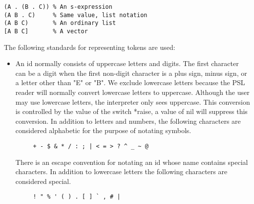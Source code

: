 \begin{verbatim}
(A . (B . C)) % An s-expression
(A B . C)     % Same value, list notation
(A B C)       % An ordinary list
[A B C]       % A vector
\end{verbatim}
  The following standards for representing tokens are used:
\begin{itemize}
\item An id normally consists of uppercase  letters  and  digits.
     The first character can be a digit when the first non-digit
     character  is  a  plus  sign, minus sign, or a letter other
     than "E" or "B".  We exclude lowercase letters because  the
     PSL  reader  will  normally  convert  lowercase  letters to
     uppercase.  Although the user may  use  lowercase  letters,
     the  interpreter  only  sees uppercase.  This conversion is
     controlled by the value of the switch *raise,  a  value  of
     nil  will suppress this conversion.  In addition to letters
     and  numbers,  the  following  characters  are   considered
     alphabetic for the purpose of notating symbols.

\begin{verbatim}
     + - $ & * / : ; | < = > ? ^ _ ~ @
\end{verbatim}
     There is an escape convention for notating an id whose name
     contains  special  characters.    In  addition to lowercase
     letters the following characters are considered special.
\begin{verbatim}
     ! " % ' ( ) . [ ] ` , # |


\end{verbatim}
\end{itemize}
